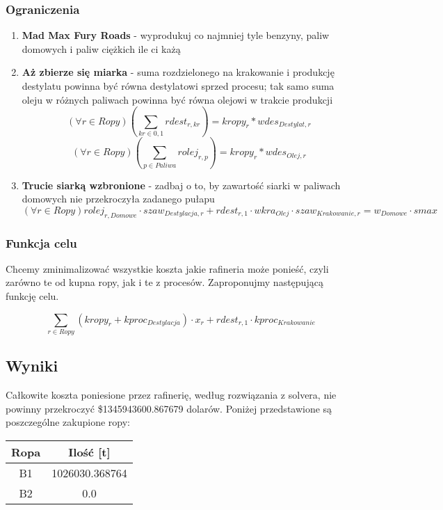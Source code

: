 \documentclass{article}
\theoremstyle{definition}
\theoremstyle{remark}
\theoremstyle{plain}
\theoremstyle{remark}
\theoremstyle{plain}
\begin{document}
\subsubsection{Ograniczenia}
\begin{enumerate}
    \item \textbf{Mad Max Fury Roads} - wyprodukuj co najmniej tyle benzyny, paliw domowych i paliw ciężkich ile ci każą
    


    \item \textbf{Aż zbierze się miarka} - suma rozdzielonego na krakowanie i produkcję destylatu powinna być równa destylatowi sprzed procesu; tak samo suma oleju w różnych paliwach powinna być równa olejowi w trakcie produkcji
    \[ (\forall r \in Ropy) \left(\sum_{kr \in {0,1}}{rdest_{r, kr}} \right) = kropy_{r} * wdes_{Destylat, r} \]
    \[ (\forall r \in Ropy) \left(\sum_{p \in Paliwa}{rolej_{r, p}} \right) = kropy_{r} * wdes_{Olej, r} \]
    \item \textbf{Trucie siarką wzbronione} - zadbaj o to, by zawartość siarki w paliwach domowych nie przekroczyła zadanego pułapu
    \[ (\forall r \in Ropy) rolej_{r, Domowe}\cdot szaw_{Destylacja, r} + rdest_{r, 1}\cdot wkra_{Olej}\cdot szaw_{Krakowanie, r} = w_{Domowe}\cdot smax \]
\end{enumerate}

\subsubsection{Funkcja celu}
Chcemy zminimalizować wszystkie koszta jakie rafineria może ponieść, czyli zarówno te od kupna ropy,
jak i te z procesów. Zaproponujmy następującą funkcję celu.

\[ \sum_{r \in Ropy}{(kropy_r + kproc_{Destylacja})\cdot x_r + rdest_{r,1}\cdot kproc_{Krakowanie}} \]


\subsection{Wyniki}
Całkowite koszta poniesione przez rafinerię, według rozwiązania z solvera, nie powinny przekroczyć \$1345943600.867679 dolarów.
Poniżej przedstawione są poszczególne zakupione ropy:
\begin{table}[H]
    \centering
        \begin{tabular}{|c|c|}
            \hline
            Ropa & Ilość [t]           \\ \hline
            B1   & 1026030.368764 \\ \hline
            B2   & 0.0          \\ \hline
        \end{tabular}
\end{table}
\end{document}
